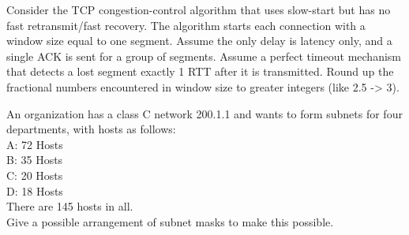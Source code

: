 \documentclass[answers,addpoints]{exam}
\begin{document}
\begin{questions}
\question
Consider the TCP congestion-control algorithm that uses slow-start but has no fast retransmit/fast recovery. The algorithm starts each connection with a window size equal to one segment. Assume the only delay is latency only, and a single ACK is sent for a group of segments. Assume a perfect timeout mechanism that detects a lost segment exactly 1 RTT after it is transmitted. Round up the fractional numbers encountered in window size to greater integers (like 2.5 -> 3).

\question
An organization has a class C network 200.1.1 and wants to form subnets for four departments, with hosts as follows:\\
A: 72 Hosts\\
B: 35 Hosts\\
C: 20 Hosts\\
D: 18 Hosts\\
There are 145 hosts in all.\\
Give a possible arrangement of subnet masks to make this possible.
\vspace{2in}


\end{questions}
\end{document}
